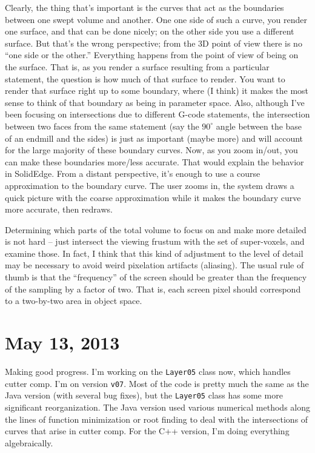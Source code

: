 \documentclass[titlepage,oneside,10pt]{article}
\begin{document}
Clearly, the thing that's important is the curves that act as the
boundaries between one swept volume and another. One one side of such
a curve, you render one surface, and that can be done nicely; on the
other side you use a different surface. But that's the wrong
perspective; from the 3D point of view there is no ``one side or the
other.'' Everything happens from the point of view of being on the
surface. That is, as you render a surface resulting from a particular
statement, the question is how much of that surface to render. You
want to render that surface right up to some boundary, where (I think)
it makes the most sense to think of that boundary as being in
parameter space. Also, although I've been focusing on intersections
due to different G-code statements, the intersection between two faces
from the same statement (say the $90^\circ$ angle between the base of
an endmill and the sides) is just as important (maybe more) and will
account for the large majority of these boundary curves.
Now, as you zoom in/out, you can make these boundaries more/less
accurate. That would explain the behavior in SolidEdge. From a
distant perspective, it's enough to use a course approximation to the
boundary curve. The user zooms in, the system draws a quick picture
with the coarse approximation while it makes the boundary curve more
accurate, then redraws. 

Determining which parts of the total volume to focus on and make more
detailed is not hard -- just intersect the viewing frustum with the
set of super-voxels, and examine those. In fact, I think that this
kind of adjustment to the level of detail may be necessary to avoid
weird pixelation artifacts (aliasing). The usual rule of thumb is that
the ``frequency'' of the screen should be greater than the frequency
of the sampling by a factor of two. That is, each screen pixel should
correspond to a two-by-two area in object space.

\section{May 13, 2013}

Making good progress. I'm working on the {\tt Layer05} class now, which
handles cutter comp. I'm on version {\tt v07}. Most of the code is
pretty much the same as the Java version (with several bug fixes), but
the {\tt Layer05} class has some more significant reorganization. The
Java version used various numerical methods along the lines of
function minimization or root finding to deal with the intersections
of curves that arise in cutter comp. For the C++ version, I'm doing
everything algebraically.
\end{document}
